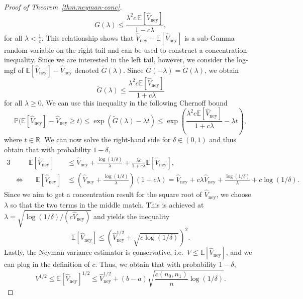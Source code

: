\documentclass[aos]{imsart2}
\theoremstyle{plain}
\theoremstyle{definition}
\newcommand{\PR}{\mathbb{P}}
\newcommand{\R}{\mathbb{R}}
\newcommand{\E}{\mathbb{E}}
\newcommand{\vhn}{\hat{V}_{\mathrm{ney}}}
\begin{document}
\begin{appendix}
\begin{proof}[Proof of Theorem~\ref{thm:neyman-conc}]
    \begin{equation*}
        G(\lambda) \leq \frac{\lambda^2c\,\E[\vhn]}{1-c\lambda},
    \end{equation*}
    for all $\lambda < \frac{1}{c}$. This relationship shows that $\vhn-\E[\vhn]$ is a sub-Gamma random variable on the right tail and can be used to construct a concentration inequality. Since we are interested in the left tail, however, we consider the log-mgf of $\E[\vhn]-\vhn$ denoted $\tilde{G}(\lambda)$. Since $G(-\lambda)=\tilde{G}(\lambda)$, we obtain
    \begin{equation*}
        \tilde{G}(\lambda) \leq \frac{\lambda^2 c \E[\vhn]}{1+ c\lambda}
    \end{equation*}
    for all $\lambda \geq 0$. We can use this inequality in the following Chernoff bound
    \begin{equation*}
        \PR\big(\E[\vhn]-\vhn \geq t\big) \leq \exp({\tilde{G}(\lambda)-\lambda t}) \leq \exp\left({\frac{\lambda^2 c \E[\vhn]}{1+ c\lambda} - \lambda t}\right),
    \end{equation*}
    where $t \in \R$. We can now solve the right-hand side for $\delta \in (0,1)$ and thus obtain that with probability $1-\delta$,
    \begin{alignat*}{3}
        &&\E[\vhn] &\leq \vhn + \frac{\log(1/\delta)}{\lambda} + \frac{\lambda c }{1+c\lambda}\E[\vhn],\\
        &\Leftrightarrow&\quad\E[\vhn] &\leq \left(\vhn + \frac{\log(1/\delta)}{\lambda}\right)(1+c\lambda) = \vhn + c\lambda \vhn + \frac{\log(1/\delta)}{\lambda} + c\log(1/\delta).
    \end{alignat*}
    Since we aim to get a concentration result for the square root of $\vhn$, we choose $\lambda$ so that the two terms in the middle match. This is achieved at $\lambda = \sqrt{\log(1/\delta)/(c\vhn)}$ and yields the inequality
    \begin{equation*}
        \E[\vhn] \leq \left(\vhn^{1/2} + \sqrt{c\log(1/\delta)}\right)^2.
    \end{equation*}
    Lastly, the Neyman variance estimator is conservative, i.e.\ $V \leq \E[\vhn]$, and we can plug in the definition of $c$. Thus, we obtain that with probability $1-\delta$,
    \begin{equation*}
        V^{1/2} \leq \E[\vhn]^{1/2} \leq \vhn^{1/2} + (b-a) \sqrt{\frac{c(n_0,n_1)}{n}\log(1/\delta)}.
    \end{equation*}
\end{proof}


\end{appendix}
\end{document}
